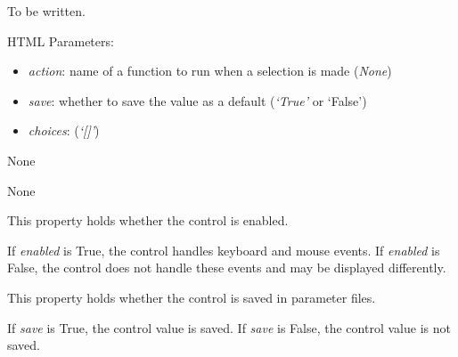 \documentclass[letterpaper,10pt,english]{sphinxmanual}
\begin{document}
\begin{fulllineitems}
\label{api:controls.ChoiceButton}
To be written.

HTML Parameters:
\begin{itemize}
\item {} 
\emph{action}: name of a function to run when a selection is made (\emph{None})

\item {} 
\emph{save}: whether to save the value as a default (\emph{`True'} or `False')

\item {} 
\emph{choices}: (\emph{`{[}{]}'})

\end{itemize}

\begin{fulllineitems}
\label{api:controls.ChoiceButton.action}
None

\end{fulllineitems}


\begin{fulllineitems}
\label{api:controls.ChoiceButton.choices}
None

\end{fulllineitems}


\begin{fulllineitems}
\label{api:controls.ChoiceButton.enabled}
This property holds whether the control is enabled.

If \emph{enabled} is True, the control handles keyboard and mouse events.
If \emph{enabled} is False, the control does not handle these events and may
be displayed differently.

\end{fulllineitems}


\begin{fulllineitems}
\label{api:controls.ChoiceButton.save}
This property holds whether the control is saved in parameter files.

If \emph{save} is True, the control value is saved.
If \emph{save} is False, the control value is not saved.


\end{fulllineitems}
\end{fulllineitems}
\end{document}
